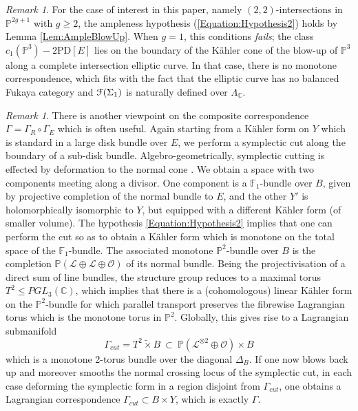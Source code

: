 \documentclass[reqno,10pt]{amsart}
\numberwithin{equation}{section}
\newcommand{\bC}{{\mathbb C}}
\newcommand{\bF}{{\mathbb F}}
\newcommand{\bP}{{\mathbb P}}
\newcommand{\scrF}{\EuScript{F}}
\theoremstyle{remark}
\newtheorem{Remark}[thm]{Remark}
\begin{document}
\begin{Remark} \label{Rem:HypothesisHolds}
For the case of interest in this paper, namely $(2,2)$-intersections in $\bP^{2g+1}$ with $g\geq 2$, the ampleness hypothesis (\ref{Equation:Hypothesis2}) holds by Lemma \ref{Lem:AmpleBlowUp}.  When $g=1$, this conditions \emph{fails}; the class $c_1(\bP^3)-2\textrm{PD}[E]$ lies on the boundary of the K\"ahler cone of the blow-up of $\bP^3$ along a complete intersection elliptic curve.  In that case, there is no monotone correspondence, which fits with the fact that the elliptic curve has no balanced Fukaya category and  $\scrF(\Sigma_1)$ is naturally defined over $\Lambda_{\bC}$.
\end{Remark}

\begin{Remark} \label{Rem:CorrespondenceViaCut}
There is another viewpoint on the composite correspondence $\Gamma = \Gamma_R \circ \Gamma_E$ which is often useful.  Again starting from a K\"ahler form on $Y$ which is standard in a large disk bundle over $E$,  we perform a symplectic cut \cite{Lerman} along the boundary of a sub-disk bundle.  Algebro-geometrically, symplectic cutting is effected by deformation to the normal cone \cite[Chapter 5]{Fulton}.   We obtain a space with two components meeting along a divisor. One component is a $\bF_1$-bundle over $B$, given by projective completion of the normal bundle to $E$, and the other $Y'$ is holomorphically isomorphic to $Y$, but equipped with a different K\"ahler form (of smaller volume).  The hypothesis \eqref{Equation:Hypothesis2} implies that one can perform the cut so as to obtain a K\"ahler form which is monotone on the total space of the $\bF_1$-bundle. The associated monotone $\bP^2$-bundle over $B$ is the completion $\bP(\mathcal{L} \oplus \mathcal{L} \oplus \mathcal{O})$ of its normal bundle. Being the projectivisation of a direct sum of line bundles, the structure group  reduces to a maximal torus $T^2 \leq PGL_3(\bC)$, which implies that there is a (cohomologous) linear K\"ahler form on the $\bP^2$-bundle for which parallel transport preserves the fibrewise Lagrangian torus which is the monotone torus in $\bP^2$.  Globally, this gives rise to a Lagrangian submanifold
\begin{equation} \label{Eqn:Cut}
\Gamma_{cut} = T^2 \tilde{\times} B \ \subset \ \bP(\mathcal{L}^{\otimes 2}\oplus\mathcal{O}) \times B
\end{equation}
which is a monotone 2-torus bundle over the diagonal $\Delta_B$.  If one now blows back up  and moreover smooths the normal crossing locus of the symplectic cut, in each case deforming the symplectic form in a region disjoint from $\Gamma_{cut}$,   one obtains a Lagrangian correspondence $\Gamma_{cut} \subset B\times Y$, which is exactly $\Gamma$.
\end{Remark}
\end{document}

